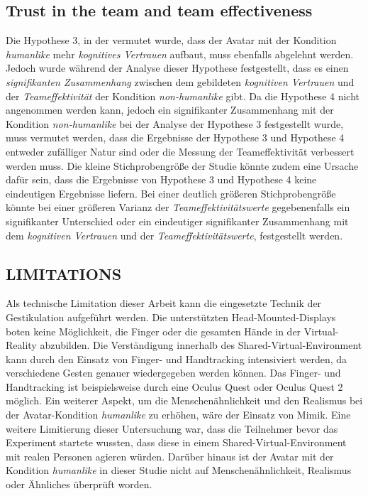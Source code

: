 \documentclass[sigchi]{acmart}
\begin{document}
\subsection{Trust in the team and team effectiveness}
Die Hypothese 3, in der vermutet wurde, dass der Avatar mit der Kondition \textit{humanlike} mehr \textit{kognitives Vertrauen} aufbaut, muss ebenfalls abgelehnt werden. Jedoch wurde während der Analyse dieser Hypothese festgestellt, dass es einen \textit{signifikanten Zusammenhang} zwischen dem gebildeten \textit{kognitiven Vertrauen} und der \textit{Teameffektivität} der Kondition \textit{non-humanlike} gibt. Da die Hypothese 4 nicht angenommen werden kann, jedoch ein signifikanter Zusammenhang mit der Kondition \textit{non-humanlike} bei der Analyse der Hypothese 3 festgestellt wurde, muss vermutet werden, dass die Ergebnisse der Hypothese 3 und Hypothese 4 entweder zufälliger Natur sind oder die Messung der Teameffektivität verbessert werden muss.
Die kleine Stichprobengröße der Studie könnte zudem eine Ursache dafür sein, dass die Ergebnisse von Hypothese 3 und Hypothese 4 keine eindeutigen Ergebnisse liefern. Bei einer deutlich größeren Stichprobengröße könnte bei einer größeren Varianz der \textit{Teameffektivitätswerte} gegebenenfalls ein signifikanter Unterschied oder ein eindeutiger signifikanter Zusammenhang mit dem \textit{kognitiven Vertrauen} und der \textit{Teameffektivitätswerte}, festgestellt werden.

\subsection{LIMITATIONS}
Als technische Limitation dieser Arbeit kann die eingesetzte Technik der Gestikulation aufgeführt werden. Die unterstützten Head-Mounted-Displays boten keine Möglichkeit, die Finger oder die gesamten Hände in der Virtual-Reality abzubilden. Die Verständigung innerhalb des Shared-Virtual-Environment kann durch den Einsatz von Finger- und Handtracking intensiviert werden, da verschiedene Gesten genauer wiedergegeben werden können. Das Finger- und Handtracking ist beispielsweise durch eine Oculus Quest oder Oculus Quest 2 möglich. Ein weiterer Aspekt, um die Menschenähnlichkeit und den Realismus bei der Avatar-Kondition \textit{humanlike} zu erhöhen, wäre der Einsatz von Mimik.
Eine weitere Limitierung dieser Untersuchung war, dass die Teilnehmer bevor das Experiment startete wussten, dass diese in einem Shared-Virtual-Environment mit realen Personen agieren würden. 
Darüber hinaus ist der Avatar mit der Kondition \textit{humanlike} in dieser Studie nicht auf Menschenähnlichkeit, Realismus oder Ähnliches überprüft worden. 
\end{document}
